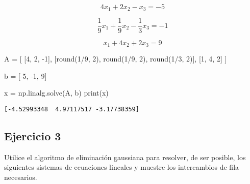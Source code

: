 \documentclass[
  letterpaper,
  DIV=11,
  numbers=noendperiod]{scrartcl}
\newenvironment{Shaded}{\begin{snugshade}}{\end{snugshade}}
\newcommand{\BuiltInTok}[1]{\textcolor[rgb]{0.00,0.23,0.31}{#1}}
\newcommand{\DecValTok}[1]{\textcolor[rgb]{0.68,0.00,0.00}{#1}}
\newcommand{\NormalTok}[1]{\textcolor[rgb]{0.00,0.23,0.31}{#1}}
\newcommand{\OperatorTok}[1]{\textcolor[rgb]{0.37,0.37,0.37}{#1}}
\begin{document}
\[4x_1 + 2x_2 - x_3 = -5\]

\[\frac{1}{9}x_1 + \frac{1}{9}x_2 - \frac{1}{3}x_3= -1\]

\[x_1 + 4x_2 + 2x_3 = 9\]

\begin{Shaded}
\begin{Highlighting}[]

\NormalTok{A }\OperatorTok{=}\NormalTok{ [}
\NormalTok{    [}\DecValTok{4}\NormalTok{, }\DecValTok{2}\NormalTok{, }\OperatorTok{{-}}\DecValTok{1}\NormalTok{],}
\NormalTok{    [}\BuiltInTok{round}\NormalTok{(}\DecValTok{1}\OperatorTok{/}\DecValTok{9}\NormalTok{, }\DecValTok{2}\NormalTok{), }\BuiltInTok{round}\NormalTok{(}\DecValTok{1}\OperatorTok{/}\DecValTok{9}\NormalTok{, }\DecValTok{2}\NormalTok{), }\BuiltInTok{round}\NormalTok{(}\DecValTok{1}\OperatorTok{/}\DecValTok{3}\NormalTok{, }\DecValTok{2}\NormalTok{)],}
\NormalTok{    [}\DecValTok{1}\NormalTok{, }\DecValTok{4}\NormalTok{, }\DecValTok{2}\NormalTok{]}
\NormalTok{]}

\NormalTok{b }\OperatorTok{=}\NormalTok{ [}\OperatorTok{{-}}\DecValTok{5}\NormalTok{, }\OperatorTok{{-}}\DecValTok{1}\NormalTok{, }\DecValTok{9}\NormalTok{]}

\NormalTok{x }\OperatorTok{=}\NormalTok{ np.linalg.solve(A, b)}
\BuiltInTok{print}\NormalTok{(x)}
\end{Highlighting}
\end{Shaded}

\begin{verbatim}
[-4.52993348  4.97117517 -3.17738359]
\end{verbatim}

\subsection{Ejercicio 3}\label{ejercicio-3}

Utilice el algoritmo de eliminación gaussiana para resolver, de ser
posible, los siguientes sistemas de ecuaciones lineales y muestre los
intercambios de fila necesarios.
\end{document}
